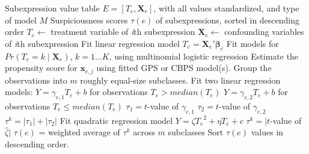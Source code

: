 \renewcommand{\algorithmicrequire}{\textbf{Input:}}
\renewcommand{\algorithmicensure}{\textbf{Output:}}
\begin{algorithm}
  \label{NUMFLalg}

  \begin{algorithmic}[1]
    \Require Subexpression value table $E=[T_e, \pmb{X}_e]$, with all values standardized, and type of model $M$
    \Ensure Suspiciousness scores $\tau \left( e \right)$ of subexpressions, sorted in descending order
        \State        $T_e \gets$ treatment variable of {\it i}th subexpression
        \State        $\pmb{X}_e\gets$ confounding variables of {\it i}th subexpression
            \State Fit linear regression model ${T_e} = {\pmb{X}_e}'{\pmb{\beta} _e}$
            \State Fit models for $Pr(T_e=k \mid \pmb{X}_e)$,
            \State$k = 1 \ldots K$, using multinomial logistic regression
        \EndIf
            \State Estimate the propensity score for ${\pmb{x}_{e,j}}$ using fitted GPS or
            \State CBPS model(s).
        \EndFor
        \State Group the observations into $m$ roughly equal-size subclasses.
                 \State Fit two linear regression models:
                 \State  $Y = {\gamma _{e,1}}{T_e} + b$   for observations $T_e>median(T_e)$
                 \State  $Y = {\gamma _{e,2}}{T_e} + b$   for observations $T_e \le median(T_e)$
                 \State  ${\tau _1} = t$-value of ${\gamma _{e,1}}$
                 \State  ${\tau _2} = t$-value of ${\gamma _{e,2}}$
                 \State ${\tau ^k} = |{\tau _1}| + |{\tau _2}|$
            \EndIf
                \State Fit quadratic regression model $Y = \zeta {T_e}^2 + \eta {T_e} + c$
                \State ${\tau ^k} = |t$-value of $\hat \zeta |$
            \EndIf
        \EndFor
        \State $\tau(e)$ = weighted average of  $\tau^k$ across $m$ subclasses
    \EndFor
    \State Sort  $\tau(e)$ values in descending order.

  \end{algorithmic}
\end{algorithm}


